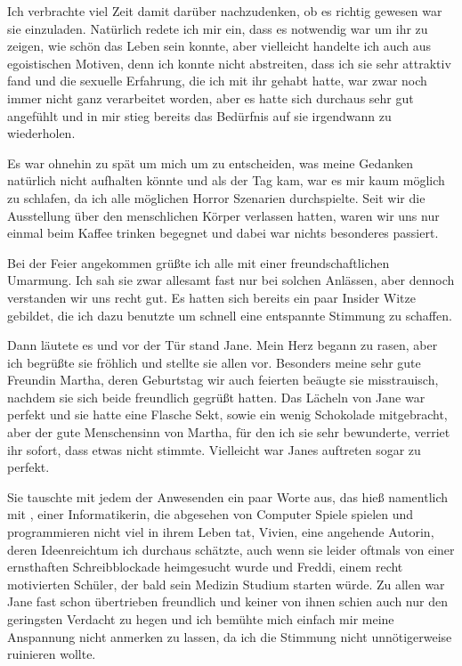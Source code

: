 \documentclass[11pt, a5paper]{article}
\newcommand{\te}{Jane } %
\newcommand{\Te}{Jane} %
\newcommand{\Gf}{Martha}
\newcommand{\Vi}{Vivien}
\newcommand{\Fr}{Freddi}
\begin{document}
\begin{spacing}{1.2}
		Ich verbrachte viel Zeit damit darüber nachzudenken, ob es richtig gewesen war sie einzuladen. Natürlich redete ich mir ein, dass es notwendig war um ihr zu zeigen, wie schön das Leben sein konnte, aber vielleicht handelte ich auch aus egoistischen Motiven, denn ich konnte nicht abstreiten, dass ich sie sehr attraktiv fand und die sexuelle Erfahrung, die ich mit ihr gehabt hatte, war zwar noch immer nicht ganz verarbeitet worden, aber es hatte sich durchaus sehr gut angefühlt und in mir stieg bereits das Bedürfnis auf sie irgendwann zu wiederholen.
		
		Es war ohnehin zu spät um mich um zu entscheiden, was meine Gedanken natürlich nicht aufhalten könnte und als der Tag kam, war es mir kaum möglich zu schlafen, da ich alle möglichen Horror Szenarien durchspielte. Seit wir die Ausstellung über den menschlichen Körper verlassen hatten, waren wir uns nur einmal beim Kaffee trinken begegnet und dabei war nichts besonderes passiert.
		
		Bei der Feier angekommen grüßte ich alle mit einer freundschaftlichen Umarmung. Ich sah sie zwar allesamt fast nur bei solchen Anlässen, aber dennoch verstanden wir uns recht gut. Es hatten sich bereits ein paar Insider Witze gebildet, die ich dazu benutzte um schnell eine entspannte Stimmung zu schaffen.
		
		Dann läutete es und vor der Tür stand \Te . Mein Herz begann zu rasen, aber ich begrüßte sie fröhlich und stellte sie allen vor. Besonders meine sehr gute Freundin \Gf , deren Geburtstag wir auch feierten beäugte sie misstrauisch, nachdem sie sich beide freundlich gegrüßt hatten. Das Lächeln von \te war perfekt und sie hatte eine Flasche Sekt, sowie ein wenig Schokolade mitgebracht, aber der gute Menschensinn von \Gf , für den ich sie sehr bewunderte, verriet ihr sofort, dass etwas nicht stimmte. Vielleicht war \Te s auftreten sogar zu perfekt.
		
		Sie tauschte mit jedem der Anwesenden ein paar Worte aus, das hieß namentlich mit  , einer Informatikerin, die abgesehen von Computer Spiele spielen und programmieren nicht viel in ihrem Leben tat, \Vi , eine angehende Autorin, deren Ideenreichtum ich durchaus schätzte, auch wenn sie leider oftmals von einer ernsthaften Schreibblockade heimgesucht wurde und \Fr, einem recht motivierten Schüler, der bald sein Medizin Studium starten würde. Zu allen war \te fast schon übertrieben freundlich und keiner von ihnen schien auch nur den geringsten Verdacht zu hegen und ich bemühte mich einfach mir meine Anspannung nicht anmerken zu lassen, da ich die Stimmung nicht unnötigerweise ruinieren wollte.
		

\end{spacing}
\end{document}
